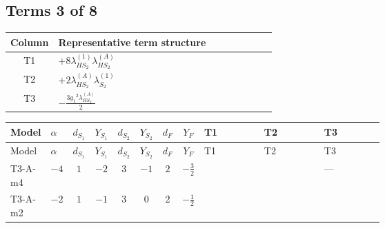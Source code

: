 \documentclass[8pt]{article}
\begin{document}
\begin{landscape}
\subsection*{Terms 3 of 8}
\begin{center}
\begin{tabular}{@{}c >{\raggedright\arraybackslash}p{0.82\linewidth}@{}}
\toprule
Column & Representative term structure \\
\midrule
T1 & \(\displaystyle +8 {\lambda_{HS_2}^{(1)}} {\lambda_{HS_2}^{(A)}}\) \\
\midrule
T2 & \(\displaystyle +2 {\lambda_{HS_2}^{(A)}} {\lambda_{S_2}^{(1)}}\) \\
\midrule
T3 & \(\displaystyle -\frac{3 {g_1}^2 {\lambda_{HS_2}^{(A)}}}{2}\) \\
\midrule
\bottomrule
\end{tabular}
\end{center}
\smallskip
\tiny
\begin{longtable}{@{}llcccccc >{\raggedright\arraybackslash}p{0.21\linewidth} >{\raggedright\arraybackslash}p{0.21\linewidth} >{\raggedright\arraybackslash}p{0.21\linewidth}@{}}
\toprule
Model & $\alpha$ & $d_{S_1}$ & $Y_{S_1}$ & $d_{S_2}$ & $Y_{S_2}$ & $d_F$ & $Y_F$ & T1 & T2 & T3 \\
\midrule
\endfirsthead
\toprule
Model & $\alpha$ & $d_{S_1}$ & $Y_{S_1}$ & $d_{S_2}$ & $Y_{S_2}$ & $d_F$ & $Y_F$ & T1 & T2 & T3 \\
\midrule
\endhead
T3-A-m4 & $-4$ & $1$ & $-2$ & $3$ & $-1$ & $2$ & $-\frac{3}{2}$ & \scriptsize\adjustbox{max width=\linewidth}{$\begin{gathered} +8 {\lambda_{HS_2}^{(1)}} {\lambda_{HS_2}^{(A)}}\end{gathered}$} & \scriptsize\adjustbox{max width=\linewidth}{$\begin{gathered} +2 {\lambda_{HS_2}^{(A)}} {\lambda_{S_2}^{(1)}}\end{gathered}$} & --- \\
\midrule
T3-A-m2 & $-2$ & $1$ & $-1$ & $3$ & $0$ & $2$ & $-\frac{1}{2}$ & \scriptsize\adjustbox{max width=\linewidth}{$\begin{gathered} +8 {\lambda_{HS_2}^{(1)}} {\lambda_{HS_2}^{(A)}}\end{gathered}$} & \scriptsize\adjustbox{max width=\linewidth}{$\begin{gathered} +2 {\lambda_{HS_2}^{(A)}} {\lambda_{S_2}^{(1)}}\end{gathered}$} & \scriptsize\adjustbox{max width=\linewidth}{$\begin{gathered} -\frac{3 {g_1}^2 {\lambda_{HS_2}^{(A)}}}{2}\end{gathered}$} \\

\end{longtable}
\end{landscape}
\end{document}
